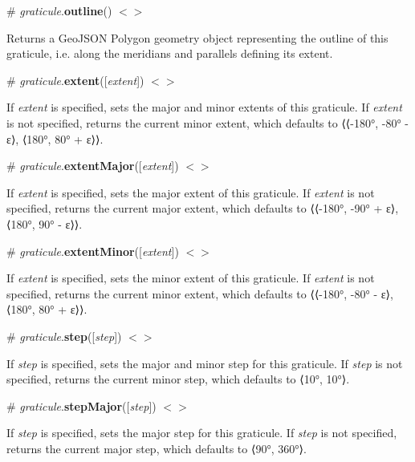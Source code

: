 \label{_graticule_outline}%
\# {\itshape graticule}.{\bfseries outline}() \href{https://github.com/d3/d3-geo/blob/master/src/graticule.js#L36}{\tt $<$$>$}

Returns a Geo\+J\+S\+ON Polygon geometry object representing the outline of this graticule, i.\+e. along the meridians and parallels defining its extent.

\label{_graticule_extent}%
\# {\itshape graticule}.{\bfseries extent}(\mbox{[}{\itshape extent}\mbox{]}) \href{https://github.com/d3/d3-geo/blob/master/src/graticule.js#L48}{\tt $<$$>$}

If {\itshape extent} is specified, sets the major and minor extents of this graticule. If {\itshape extent} is not specified, returns the current minor extent, which defaults to ⟨⟨-\/180°, -\/80° -\/ ε⟩, ⟨180°, 80° + ε⟩⟩.

\label{_graticule_extentMajor}%
\# {\itshape graticule}.{\bfseries extent\+Major}(\mbox{[}{\itshape extent}\mbox{]}) \href{https://github.com/d3/d3-geo/blob/master/src/graticule.js#L53}{\tt $<$$>$}

If {\itshape extent} is specified, sets the major extent of this graticule. If {\itshape extent} is not specified, returns the current major extent, which defaults to ⟨⟨-\/180°, -\/90° + ε⟩, ⟨180°, 90° -\/ ε⟩⟩.

\label{_graticule_extentMinor}%
\# {\itshape graticule}.{\bfseries extent\+Minor}(\mbox{[}{\itshape extent}\mbox{]}) \href{https://github.com/d3/d3-geo/blob/master/src/graticule.js#L62}{\tt $<$$>$}

If {\itshape extent} is specified, sets the minor extent of this graticule. If {\itshape extent} is not specified, returns the current minor extent, which defaults to ⟨⟨-\/180°, -\/80° -\/ ε⟩, ⟨180°, 80° + ε⟩⟩.

\label{_graticule_step}%
\# {\itshape graticule}.{\bfseries step}(\mbox{[}{\itshape step}\mbox{]}) \href{https://github.com/d3/d3-geo/blob/master/src/graticule.js#L71}{\tt $<$$>$}

If {\itshape step} is specified, sets the major and minor step for this graticule. If {\itshape step} is not specified, returns the current minor step, which defaults to ⟨10°, 10°⟩.

\label{_graticule_stepMajor}%
\# {\itshape graticule}.{\bfseries step\+Major}(\mbox{[}{\itshape step}\mbox{]}) \href{https://github.com/d3/d3-geo/blob/master/src/graticule.js#L76}{\tt $<$$>$}

If {\itshape step} is specified, sets the major step for this graticule. If {\itshape step} is not specified, returns the current major step, which defaults to ⟨90°, 360°⟩.

